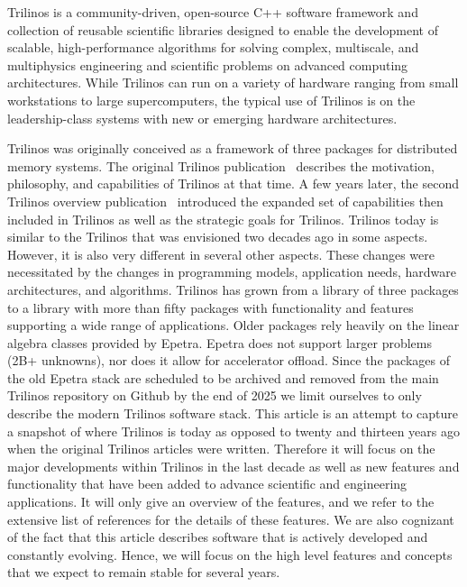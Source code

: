 
Trilinos is a community-driven, open-source C++ software framework and collection of reusable scientific libraries designed to enable the development of scalable, high-performance algorithms for solving complex, multiscale, and multiphysics engineering and scientific problems on advanced computing architectures.
While Trilinos can run on a variety of hardware ranging from small workstations to large supercomputers, the typical use of Trilinos is on the leadership-class systems with new or emerging hardware architectures.

Trilinos was originally conceived as a framework of three packages for distributed memory systems. The original Trilinos publication~\cite{Heroux2005a} describes the motivation, philosophy, and capabilities of Trilinos at that time. A few years later, the second Trilinos overview publication~\cite{Heroux2012} introduced the expanded set of capabilities then included in Trilinos as well as the strategic goals for Trilinos. Trilinos today is similar to the Trilinos that was envisioned two decades ago in some aspects. However, it is also very different in several other aspects. These changes were necessitated by the changes in programming models, application needs, hardware architectures, and algorithms. Trilinos has grown from a library of three packages to a library with more than fifty packages with functionality and features supporting a wide range of applications.
Older packages rely heavily on the linear algebra classes provided by Epetra.
Epetra does not support larger problems (2B+ unknowns), nor does it allow for accelerator offload.
Since the packages of the old Epetra stack are scheduled to be archived and removed from the main Trilinos repository on Github by the end of 2025 we limit ourselves to only describe the modern Trilinos software stack.
This article is an attempt to capture a snapshot of where Trilinos is today as opposed to twenty and thirteen years ago when the original Trilinos articles were written.
Therefore it will focus on the major developments within Trilinos in the last decade as well as new features and functionality that have been added to advance scientific and engineering applications.
It will only give an overview of the features, and we refer to the extensive list of references for the details of these features.
We are also cognizant of the fact that this article describes software that is actively developed and constantly evolving.
Hence, we will focus on the high level features and concepts that we expect to remain stable for several years.



